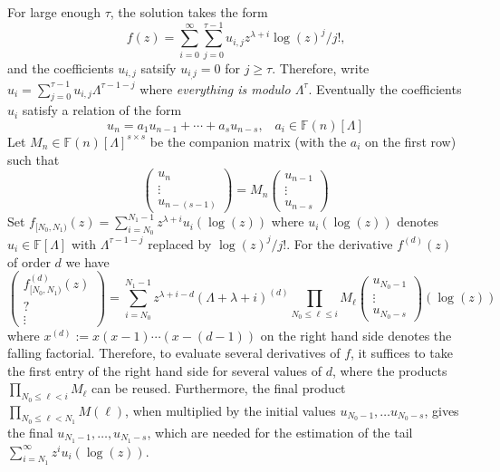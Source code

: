 \documentclass[10pt]{article}
\numberwithin{equation}{section}
\begin{document}
For large enough $\tau$, the solution takes the form
\begin{equation*}
f(z) = \sum_{i=0}^{\infty} \sum_{j=0}^{\tau-1} u_{i,j} z^{\lambda+i} \log(z)^j/j!\text{,}
\end{equation*}
and the coefficients $u_{i,j}$ satsify $u_{i_,j} = 0$ for $j \ge \tau$. Therefore, write $u_i = \sum_{j=0}^{\tau-1} u_{i,j} \Lambda^{\tau-1-j}$ where \emph{everything is modulo $\Lambda^\tau$}.
Eventually the coefficients $u_{i}$ satisfy a relation of the form
\begin{equation}
\label{unrec}
u_n = a_1 u_{n-1} + \cdots + a_s u_{n-s}\text{,} \quad a_i \in \mathbb{F}(n)[\Lambda]
\end{equation}
Let $M_n \in \mathbb{F}(n)[\Lambda] ^{s \times s}$ be the companion matrix (with the $a_i$ on the first row) such that
\begin{equation*}
\left(\begin{array}{c}
u_n\\
\vdots \\
u_{n-(s-1)}
\end{array}\right)
=M_n
\left(\begin{array}{c}
u_{n-1}\\
\vdots \\
u_{n-s}
\end{array}\right)
\end{equation*}
Set $f_{[N_0,N_1)}(z) = \sum_{i=N_0}^{N_1-1} z^{\lambda+i} u_i(\log(z))$ where $u_i(\log(z))$ denotes $u_i \in \mathbb{F}[\Lambda]$ with $\Lambda^{\tau-1-j}$ replaced by $\log(z)^j/j!$.
For the derivative $f^{(d)}(z)$ of order $d$ we have
\begin{equation*}
\left(\begin{array}{c}
f_{[N_0,N_1)}^{(d)}(z) \\
? \\
\vdots
\end{array}\right) = \sum_{i=N_0}^{N_1-1} z^{\lambda+i-d} (\Lambda+\lambda+i)^{(d)}\prod_{N_0\le \ell \le i}M_{\ell}
\left(\begin{array}{c}
u_{N_0-1}\\
\vdots \\
u_{N_0-s}
\end{array}\right) (\log(z))\end{equation*}
where $x^{(d)} := x(x-1)\cdots(x-(d-1))$ on the right hand side denotes the falling factorial. Therefore, to evaluate several derivatives of $f$, it suffices to take the first entry of the right hand side for several values of $d$, where the products $\prod_{N_0\le \ell < i}M_{\ell}$ can be reused. Furthermore, the final product $\prod_{N_0\le \ell < N_1}M(\ell)$, when multiplied by the initial values $u_{N_0-1}, \dots u_{N_0-s}$, gives the final $u_{N_1-1}, \dots, u_{N_1-s}$, which are needed for the estimation of the tail $\sum_{i=N_1}^{\infty} z^i u_i(\log(z))$.
\end{document}
